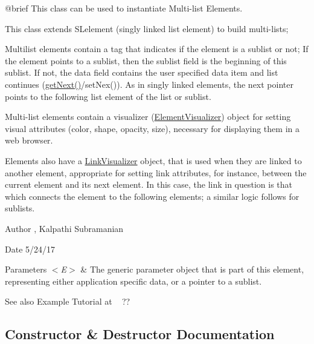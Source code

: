 \begin{DoxyVerb}@brief This class can be used to instantiate Multi-list Elements.

This class extends SLelement (singly linked list element) to build multi-lists;
\end{DoxyVerb}
 Multilist elements contain a tag that indicates if the element is a sublist or not; If the element points to a sublist, then the sublist field is the beginning of this sublist. If not, the data field contains the user specified data item and list continues (\mbox{\hyperlink{classbridges_1_1_m_lelement_aceebd292e7d497f44eea5c4845e7709f}{get\+Next()}}/set\+Nex()). As in singly linked elements, the next pointer points to the following list element of the list or sublist.

Multi-\/list elements contain a visualizer (\mbox{\hyperlink{classbridges_1_1_element_visualizer}{Element\+Visualizer}}) object for setting visual attributes (color, shape, opacity, size), necessary for displaying them in a web browser.

Elements also have a \mbox{\hyperlink{classbridges_1_1_link_visualizer}{Link\+Visualizer}} object, that is used when they are linked to another element, appropriate for setting link attributes, for instance, between the current element and its next element. In this case, the link in question is that which connects the element to the following elements; a similar logic follows for sublists.

\begin{DoxyAuthor}{Author}
, Kalpathi Subramanian
\end{DoxyAuthor}
\begin{DoxyDate}{Date}
5/24/17
\end{DoxyDate}

\begin{DoxyParams}{Parameters}
{\em $<$\+E$>$} & The generic parameter object that is part of this element, representing either application specific data, or a pointer to a sublist.\\
\hline
\end{DoxyParams}
\begin{DoxySeeAlso}{See also}
Example Tutorial at ~\newline
 ?? 
\end{DoxySeeAlso}


\subsection{Constructor \& Destructor Documentation}
\mbox{\label{classbridges_1_1_m_lelement_a5d0e64b99abf4d1ad1d2cc89ca28343c}} 
